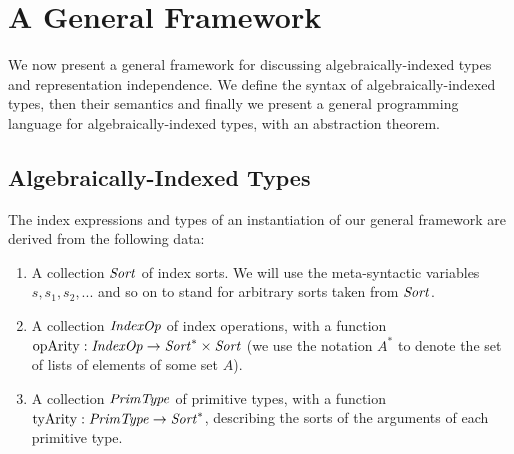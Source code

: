 \section{A General Framework}
\label{sec:a-general-framework}

We now present a general framework for discussing
algebraically-indexed types and representation independence. We define
the syntax of algebraically-indexed types, then their semantics and
finally we present a general programming language for
algebraically-indexed types, with an abstraction theorem.

\subsection{Algebraically-Indexed Types}
\label{sec:algebraically-indexed-types}

The index expressions and types of an instantiation of our general
framework are derived from the following data:
\begin{enumerate}
\item A collection $\mathit{Sort}$ of index sorts. We will use the
  meta-syntactic variables $s,s_1,s_2,...$ and so on to stand for
  arbitrary sorts taken from $\mathit{Sort}$.
\item A collection $\mathit{IndexOp}$ of index operations, with a function
  $\mathrm{opArity} : \mathit{IndexOp} \to \mathit{Sort}^* \times \mathit{Sort}$ (we use
  the notation $A^*$ to denote the set of lists of elements of some
  set $A$).
\item A collection $\mathit{PrimType}$ of primitive types, with a function
  $\mathrm{tyArity} : \mathit{PrimType} \to \mathit{Sort}^*$, describing the sorts
  of the arguments of each primitive type.
\end{enumerate}

